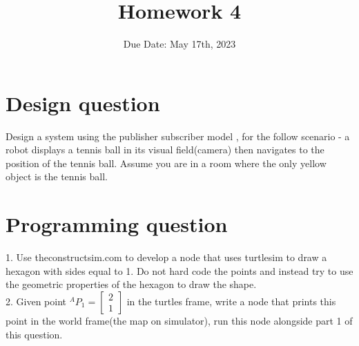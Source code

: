 \documentclass{article}
\title{Homework 4}
\author{}
\date{Due Date: May 17th, 2023}
\begin{document}
\maketitle

\section{Design question}
Design a system using the publisher subscriber model , for the follow scenario - a robot displays a tennis ball in its visual field(camera) then navigates to the position of the tennis ball. Assume you are in a room where the only yellow object is the tennis ball.
\section{Programming question}
1. Use theconstructsim.com to develop a node that uses turtlesim to draw a hexagon with sides equal to 1. Do not hard code the points and instead try to use the geometric properties of the hexagon to draw the shape.\\
2. Given point ${}^AP_1= \begin{bmatrix} 2 \\1  \end{bmatrix}$ in the turtles frame, write a node that prints this point in the world frame(the map on simulator), run this node alongside part 1 of this question.
\end{document}
